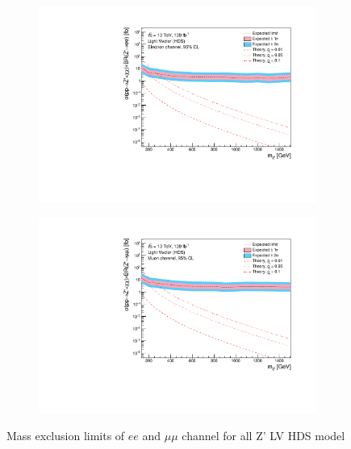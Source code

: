 \documentclass[12pt, a4paper]{book}
\begin{document}
\begin{figure}[!ht]
	\centering
   \begin{subfigure}[b]{0.49\textwidth}
      \centering
      \includegraphics[width=1\textwidth]{Limits/LV_HDS/mass_exclusion_ee.pdf}
      \end{subfigure}
   \hfill
   \begin{subfigure}[b]{0.49\textwidth}
      \centering
      \includegraphics[width=1\textwidth]{Limits/LV_HDS/mass_exclusion_uu.pdf}
      \end{subfigure}
   \caption{Mass exclusion limits of $ee$ and $\mu\mu$ channel for all Z' LV HDS model}\label{fig:LV_HDS_exclusion_ee_uu}
\end{figure}
\clearpage
\end{document}
